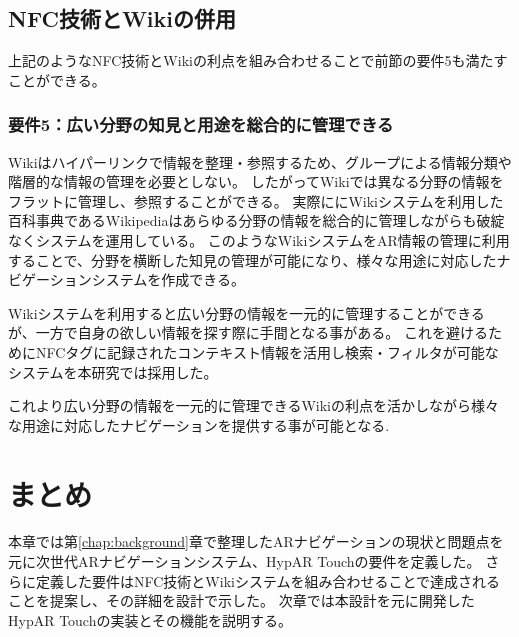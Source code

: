 \subsection{NFC技術とWikiの併用}
上記のようなNFC技術とWikiの利点を組み合わせることで前節の要件5も満たすことができる。

\subsubsection*{要件5：広い分野の知見と用途を総合的に管理できる}
Wikiはハイパーリンクで情報を整理・参照するため、グループによる情報分類や階層的な情報の管理を必要としない。
したがってWikiでは異なる分野の情報をフラットに管理し、参照することができる。
実際ににWikiシステムを利用した百科事典であるWikipediaはあらゆる分野の情報を総合的に管理しながらも破綻なくシステムを運用している。
このようなWikiシステムをAR情報の管理に利用することで、分野を横断した知見の管理が可能になり、様々な用途に対応したナビゲーションシステムを作成できる。

Wikiシステムを利用すると広い分野の情報を一元的に管理することができるが、一方で自身の欲しい情報を探す際に手間となる事がある。
これを避けるためにNFCタグに記録されたコンテキスト情報を活用し検索・フィルタが可能なシステムを本研究では採用した。

これより広い分野の情報を一元的に管理できるWikiの利点を活かしながら様々な用途に対応したナビゲーションを提供する事が可能となる.



\section{まとめ}
本章では第\ref{chap:background}章で整理したARナビゲーションの現状と問題点を元に次世代ARナビゲーションシステム、HypAR Touchの要件を定義した。
さらに定義した要件はNFC技術とWikiシステムを組み合わせることで達成されることを提案し、その詳細を設計で示した。
次章では本設計を元に開発したHypAR Touchの実装とその機能を説明する。